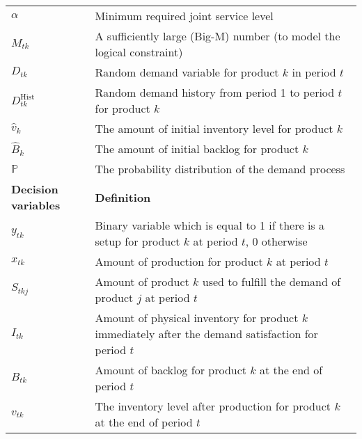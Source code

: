 \documentclass[11pt]{article}
\newcommand{\ti}{t} %
\newcommand{\ka}{k} %
\newcommand{\jey}{j} %
\newcommand{\Bi}{B} %
\newcommand{\Vi}{v} %
\newcommand{\Es}{S} %
\newcommand{\x}{x} %
\newcommand{\y}{y} %
\newcommand{\InvPos}{inventory level after production }
\newcommand{\Csub}{\mathcal{K}^+_k}
\newcommand{\Psub}{\mathcal{K}^-_k}
\newcommand{\cred}{\color{black}}
\begin{document}
\begin{table}[H]
\begin{adjustbox}{width=1\textwidth,center=\textwidth}
\begin{tabular}{ll}
$\alpha$  & Minimum required joint service level \\ 
$M_{\ti \ka}$  & A sufficiently large (Big-M) number (to model the logical constraint) \\ 
${D}_{\ti \ka}$ & Random demand variable for product $\ka $ in period $\ti$  \\ 
${D}^\text{Hist}_{\ti \ka}$ & Random demand history from period 1 to period $\ti$ for product $\ka $  \\ 
$\hat{\Vi}_{\ka} $&  The amount of initial inventory level for product $\ka$ \\
$\hat{\Bi}_{\ka} $&  The amount of initial backlog for product $\ka$   \\
$\mathbb{P} $&  The probability distribution of the demand process \\ %
\midrule
{\textbf {Decision variables}} & {\textbf {Definition}} \\ \midrule
$\y_{\ti \ka}$ & Binary variable which is equal to 1 if there is a setup for product $k$ at period $\ti$, 0 otherwise \\ 
$\x_{\ti \ka}$ & Amount of production for product $\ka$  at period $\ti$  \\ 
$\Es_{\ti \ka \jey}$ & Amount of product $\ka$  used to fulfill the demand of product $\jey$  at period $\ti$   \\
${I}_{\ti \ka}$ & Amount of physical inventory for product $k$ immediately after the demand satisfaction for period $\ti$  \\
${\Bi}_{\ti \ka}$ & Amount of backlog for product $k$ at the end of period $\ti$  \\
${\Vi}_{\ti \ka}$ & The \InvPos for product $\ka$ at the end of period $\ti$  \\
 \bottomrule
\end{tabular}
\end{adjustbox}
 \label{tab:Sub_parameters}
\end{table}
\end{document}

